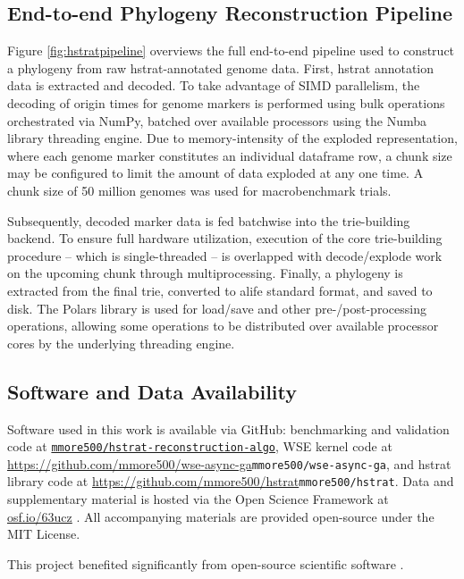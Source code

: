 \subsection{End-to-end Phylogeny Reconstruction Pipeline}
\label{sec:pipeline}



Figure \ref{fig:hstratpipeline} overviews the full end-to-end pipeline used to construct a phylogeny from raw hstrat-annotated genome data.
First, hstrat annotation data is extracted and decoded.
To take advantage of SIMD parallelism, the decoding of origin times for genome markers is performed using bulk operations orchestrated via NumPy, batched over available processors using the Numba library threading engine.
Due to memory-intensity of the exploded representation, where each genome marker constitutes an individual dataframe row, a chunk size may be configured to limit the amount of data exploded at any one time.
A chunk size of 50 million genomes was used for macrobenchmark trials.

Subsequently, decoded marker data is fed batchwise into the trie-building backend.
To ensure full hardware utilization, execution of the core trie-building procedure -- which is single-threaded -- is overlapped with decode/explode work on the upcoming chunk through multiprocessing.
Finally, a phylogeny is extracted from the final trie, converted to alife standard format, and saved to disk.
The Polars library is used for load/save and other pre-/post-processing operations, allowing some operations to be distributed over available processor cores by the underlying threading engine.

\subsection{Software and Data Availability} \label{sec:materials}

Software used in this work is available via GitHub: benchmarking and validation code at \href{https://github.com/mmore500/hstrat-reconstruction-algo}{\texttt{mmore500/hstrat-reconstruction-algo}}, WSE kernel code at \url{https://github.com/mmore500/wse-async-ga}{\texttt{mmore500/wse-async-ga}}, and hstrat library code at \url{https://github.com/mmore500/hstrat}{\texttt{mmore500/hstrat}}.
Data and supplementary material is hosted via the Open Science Framework at \url{osf.io/63ucz} \citep{Moreno_Dolson_Zaman_Singhvi_Wagner_2025,foster2017open}.
All accompanying materials are provided open-source under the MIT License.

This project benefited significantly from open-source scientific software \citep{2020SciPy-NMeth,harris2020array,reback2020pandas,mckinney-proc-scipy-2010,waskom2021seaborn,hunter2007matplotlib,moreno2023teeplot,moreno2024downstream}.
